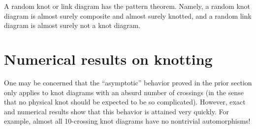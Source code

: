 \documentclass[amsmath,longbibliography,secnumarabic,floatfix,amssymb,nofootinbib,nobibnotes,letterpaper,11pt,notitlepage,preprint]{revtex4-1}
\begin{document}
\begin{corollary}
  A random knot or link diagram has the pattern theorem. Namely, a random knot diagram is almost
  surely composite and almost surely knotted, and a random link diagram is almost surely not a knot
  diagram.
\end{corollary}

\section{Numerical results on knotting}
\label{sec:randres}

One may be concerned that the ``asymptotic'' behavior proved in the prior section only applies to
knot diagrams with an absurd number of crossings (in the sense that no physical knot should be
expected to be so complicated). However, exact and numerical results show that this behavior is
attained very quickly. For example, almost all 10-crossing knot diagrams have no nontrivial
automorphisms!


\end{document}
